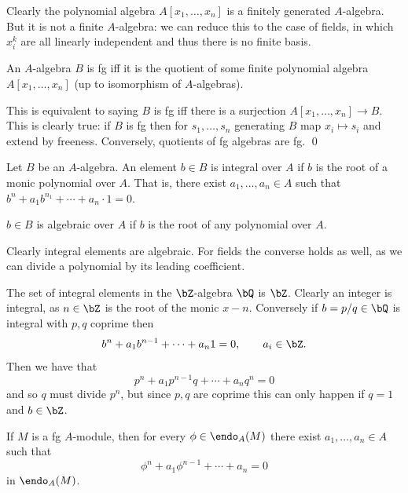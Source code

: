 \eexam

\bexam

    Clearly the polynomial algebra $A[x_1,\dots,x_n]$ is a finitely generated $A$-algebra.
    But it is not a finite $A$-algebra: we can reduce this to the case of fields, in which $x_i^k$ are all linearly independent and thus
    there is no finite basis.

\eexam

\blemm

    An $A$-algebra $B$ is fg iff it is the quotient of some finite polynomial algebra $A[x_1,\dots,x_n]$ (up to isomorphism of $A$-algebras).

\elemm

\bproof

    This is equivalent to saying $B$ is fg iff there is a surjection $A[x_1,\dots,x_n]\to B$.
    This is clearly true: if $B$ is fg then for $s_1,\dots,s_n$ generating $B$ map $x_i\mapsto s_i$ and extend by freeness.
    Conversely, quotients of fg algebras are fg.
    \qed

\eproof

\bdefn

    Let $B$ be an $A$-algebra.
    An element $b\in B$ is {\emphcolor integral} over $A$ if $b$ is the root of a monic polynomial over $A$.
    That is, there exist $a_1,\dots,a_n\in A$ such that $b^n+a_1b^{n_1}+\cdots+a_n\cdot1=0$.

    $b\in B$ is {\emphcolor algebraic} over $A$ if $b$ is the root of any polynomial over $A$.

\edefn

Clearly integral elements are algebraic.
For fields the converse holds as well, as we can divide a polynomial by its leading coefficient.

\bexam

    The set of integral elements in the $\bZ$-algebra $\bQ$ is $\bZ$.
    Clearly an integer is integral, as $n\in\bZ$ is the root of the monic $x-n$.
    Conversely if $b=p/q\in\bQ$ is integral with $p,q$ coprime then
    $$ b^n + a_1b^{n-1} + \cdots + a_n1 = 0,\qquad a_i\in\bZ . $$
    Then we have that
    $$ p^n + a_1p^{n-1}q + \cdots + a_nq^n = 0 $$
    and so $q$ must divide $p^n$, but since $p,q$ are coprime this can only happen if $q=1$ and $b\in\bZ$.

\eexam

\blemm

    If $M$ is a fg $A$-module, then for every $\phi\in\endo_A(M)$ there exist $a_1,\dots,a_n\in A$ such that
    $$ \phi^n + a_1\phi^{n-1} + \cdots + a_n = 0 $$
    in $\endo_A(M)$.

